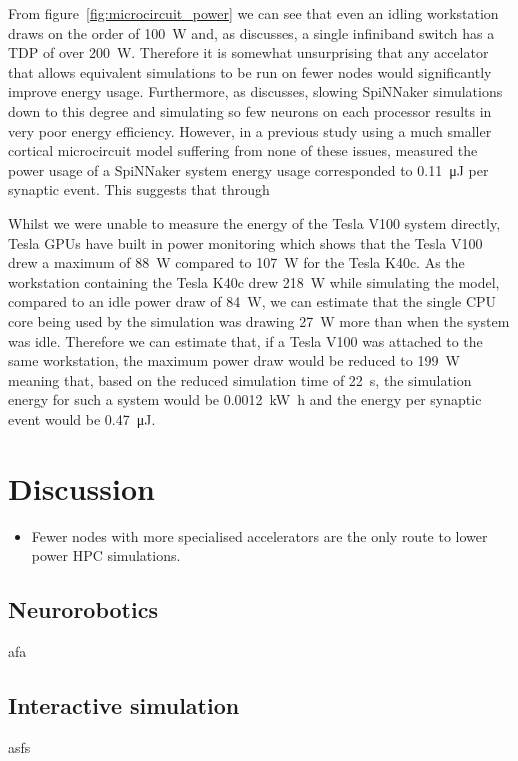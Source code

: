 \documentclass[utf8]{frontiersSCNS} %
\begin{document}
From figure~\ref{fig:microcircuit_power} we can see that even an idling workstation draws on the order of \SI{100}{\watt} and, as \citeauthor{VanAlbada2018} discusses, a single infiniband switch has a TDP of over \SI{200}{\watt}.
Therefore it is somewhat unsurprising that any accelator that allows equivalent simulations to be run on fewer nodes would significantly improve energy usage.
Furthermore, as \citeauthor{VanAlbada2018} discusses, slowing SpiNNaker simulations down to this degree and simulating so few neurons on each processor results in very poor energy efficiency.
However, in a previous study using a much smaller cortical microcircuit model suffering from none of these issues, \citet{Sharp2012} measured the power usage of a SpiNNaker system energy usage corresponded to \SI{0.11}{\micro\joule} per synaptic event.
This suggests that through 

Whilst we were unable to measure the energy of the Tesla V100 system directly, Tesla GPUs have built in power monitoring which shows that the Tesla V100 drew a maximum of \SI{88}{\watt} compared to \SI{107}{\watt} for the Tesla K40c.
As the workstation containing the Tesla K40c drew \SI{218}{\watt} while simulating the model, compared to an idle power draw of \SI{84}{\watt}, we can estimate that the single CPU core being used by the simulation was drawing \SI{27}{\watt} more than when the system was idle.
Therefore we can estimate that, if a Tesla V100 was attached to the same workstation, the maximum power draw would be reduced to \SI{199}{\watt} meaning that, based on the reduced simulation time of \SI{22}{\second}, the simulation energy for such a system would be \SI{0.0012}{\kilo\watt\hour} and the energy per synaptic event would be \SI{0.47}{\micro\joule}.

\section{Discussion}
\begin{itemize}
    \item Fewer nodes with more specialised accelerators are the only route to lower power HPC simulations.
\end{itemize}

\subsection{Neurorobotics}
afa

\subsection{Interactive simulation}
asfs
\end{document}
